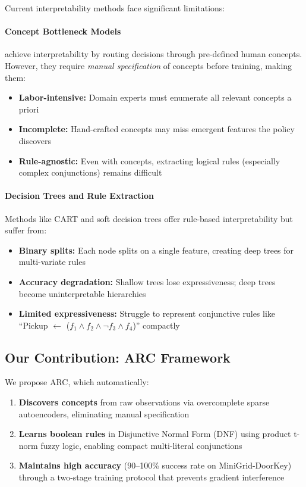 \documentclass[11pt,twocolumn]{article}
\begin{document}
Current interpretability methods face significant limitations:

\paragraph{Concept Bottleneck Models} \cite{koh2020concept} achieve interpretability by routing decisions through pre-defined human concepts. However, they require \emph{manual specification} of concepts before training, making them:
\begin{itemize}
\item \textbf{Labor-intensive:} Domain experts must enumerate all relevant concepts a priori
\item \textbf{Incomplete:} Hand-crafted concepts may miss emergent features the policy discovers
\item \textbf{Rule-agnostic:} Even with concepts, extracting logical rules (especially complex conjunctions) remains difficult
\end{itemize}

\paragraph{Decision Trees and Rule Extraction} Methods like CART \cite{breiman1984classification} and soft decision trees \cite{frosst2017distilling} offer rule-based interpretability but suffer from:
\begin{itemize}
\item \textbf{Binary splits:} Each node splits on a single feature, creating deep trees for multi-variate rules
\item \textbf{Accuracy degradation:} Shallow trees lose expressiveness; deep trees become uninterpretable hierarchies
\item \textbf{Limited expressiveness:} Struggle to represent conjunctive rules like ``Pickup $\leftarrow$ ($f_1 \land f_2 \land \neg f_3 \land f_4$)'' compactly
\end{itemize}

\subsection{Our Contribution: ARC Framework}

We propose ARC, which automatically:
\begin{enumerate}
\item \textbf{Discovers concepts} from raw observations via overcomplete sparse autoencoders, eliminating manual specification
\item \textbf{Learns boolean rules} in Disjunctive Normal Form (DNF) using product t-norm fuzzy logic, enabling compact multi-literal conjunctions
\item \textbf{Maintains high accuracy} (90--100\% success rate on MiniGrid-DoorKey) through a two-stage training protocol that prevents gradient interference
\end{enumerate}
\end{document}
